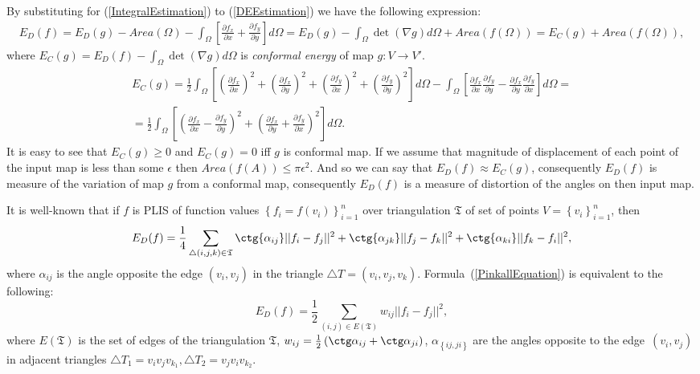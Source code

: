\documentclass{article}
\begin{document}
By substituting for (\ref{IntegralEstimation}) to (\ref{DEEstimation}) we have the following expression:
\begin{multline}
  E_D(f) = E_D(g) - Area(\Omega) - \int_{\Omega}{\left[\frac{\partial f_x}{\partial x} + \frac{\partial f_y}{\partial y}\right]} d\Omega = E_D(g) - \int_{\Omega} \det \left(\nabla g \right) d\Omega + Area(f(\Omega)) 
  = E_C(g) + Area(f(\Omega)),
\end{multline}
where $ E_C(g) = E_D(f) - \int_{\Omega} \det \left(\nabla g \right) d\Omega$ is \textit{conformal energy} of map $g: V \to V'$. 
\begin{multline*}
 E_C(g) = \frac{1}{2} \int_{\Omega} \left[\left(\frac{\partial f_x}{\partial x}\right)^2 + \left(\frac{\partial f_x}{\partial y}\right)^2 + 
 \left(\frac{\partial f_y}{\partial x}\right)^2  + \left(\frac{\partial f_y}{\partial y}\right)^2 \right] d\Omega - \int_{\Omega}{\left[\frac{\partial f_x}{\partial x} \frac{\partial f_y}{\partial y} -
 \frac{\partial f_x}{\partial y} \frac{\partial f_y}{\partial x} \right]} d \Omega = \\
 = \frac{1}{2} \int_{\Omega}\left[ \left(\frac{\partial f_x}{\partial x} - \frac{\partial f_y}{\partial y} \right)^2 + \left( \frac{\partial f_x}{\partial y} + \frac{\partial f_y}{\partial x} \right)^2 \right] d\Omega.
\end{multline*}
It is easy to see that $E_C(g) \ge 0$ and $E_C(g) = 0$ iff $g$ is conformal map. If we assume that magnitude of displacement of each point of the input map is less than some $\epsilon$ 
then $Area(f(A)) \le \pi \epsilon^2$. And so we can say that $E_D(f) \approx E_C(g)$, consequently $E_D(f)$ is measure of the variation of map $g$ from a conformal map, consequently $E_D(f)$ is a measure of distortion of the angles on then input map.

It is well-known that if $f$ is PLIS of function values $\left\{f_i = f(v_i)\right\}_{i=1}^n$ over triangulation $\mathfrak{T}$ of set of points $V = \left\{v_i\right\}_{i=1}^n$, then  
\begin{equation}
\label{PinkallEquation}
  E_D(f) = \frac{1}{4} \sum_{\triangle (i, j, k) \in \mathfrak{T}}
  {\ctg{\alpha_{ij}}||f_i - f_j||^2 + \ctg{\alpha_{jk}}||f_j - f_k||^2 + \ctg{\alpha_{ki}}||f_k - f_i||^2},
\end{equation}
where $\alpha_{ij}$ is the angle opposite the edge $(v_i, v_j)$ in the triangle $\triangle T = (v_i, v_j, v_k)$. Formula~(\ref{PinkallEquation}) is equivalent to the following:
\begin{equation}
  \label{EDOverEdges}
  E_D(f) = \frac{1}{2} \sum_{\left( i, j \right) \in E\left(\mathfrak{T}\right)}{w_{ij} ||f_i - f_j||^2}, 
\end{equation}
where $E(\mathfrak{T})$ is the set of edges of the triangulation $\mathfrak{T}$, $w_{ij} = \frac{1}{2}\left(\ctg\alpha_{ij} + \ctg\alpha_{ji}\right)$, $\alpha_{\left\{{ij, ji}\right\}}$ are the angles opposite 
to the edge~$(v_i, v_j)$ in adjacent triangles $\triangle T_1 = v_i v_j v_{k_1}, \triangle T_2 = v_j v_i v_{k_2}$.
\end{document}
